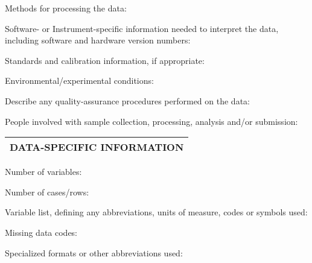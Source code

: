 \documentclass[]{article}
\begin{document}
Methods for processing the data:

Software- or Instrument-specific information needed to interpret the
data, including software and hardware version numbers:

Standards and calibration information, if appropriate:

Environmental/experimental conditions:

Describe any quality-assurance procedures performed on the data:

People involved with sample collection, processing, analysis and/or
submission:

\begin{longtable}[]{@{}l@{}}
\toprule
DATA-SPECIFIC INFORMATION \tabularnewline
\bottomrule
\end{longtable}

Number of variables:

Number of cases/rows:

Variable list, defining any abbreviations, units of measure, codes or
symbols used:

Missing data codes:

Specialized formats or other abbreviations used:
\end{document}
